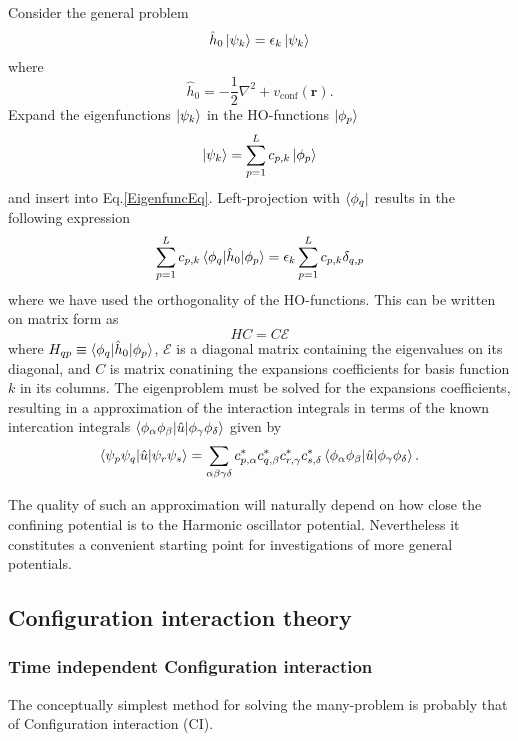 \documentclass[aip,jcp,reprint,floatfix]{revtex4-1}
\begin{document}
Consider the general problem
\begin{equation}
 \hat{h}_0 \ket{\psi_k} = \epsilon_k \ket{\psi_k} \label{EigenfuncEq}
\end{equation}
where 
\begin{equation}
 \hat{h}_0 = -\frac{1}{2}\nabla^2 + v_{\text{conf}}(\mathbf{r}).
\end{equation}
Expand the eigenfunctions $\ket{\psi_k}$ in the HO-functions $\ket{\phi_p}$
\begin{equation}
 \ket{\psi_k} = \sum_{p=1}^L c_{p,k} \ket{\phi_p} 
\end{equation}
and insert into Eq.\eqref{EigenfuncEq}. Left-projection with
$\bra{\phi_q}$ results in the following expression
\begin{equation}
 \sum_{p=1}^L c_{p,k} \braket{\phi_q|\hat{h}_0|\phi_p} = \epsilon_k \sum_{p=1}^L c_{p,k} \delta_{q,p}
\end{equation}
where we have used the orthogonality of the HO-functions. This can be written on matrix form as 
\begin{equation}
 HC = C\mathcal{E}
\end{equation}
where $H_{qp} \equiv \braket{\phi_q|\hat{h}_0|\phi_p}$, $\mathcal{E}$
is a diagonal matrix containing the eigenvalues on its diagonal, and
$C$ is matrix conatining the expansions coefficients for basis
function $k$ in its columns. The eigenproblem must be solved for the
expansions coefficients, resulting in a approximation of the
interaction integrals in terms of the known intercation integrals
$\braket{\phi_\alpha \phi_\beta|\hat{u}|\phi_\gamma \phi_\delta}$
given by
\begin{equation}
 \braket{\psi_p \psi_q| \hat{u}| \psi_r \psi_s} = \sum_{\alpha \beta \gamma \delta} c^*_{p,\alpha} c^*_{q,\beta} c^*_{r,\gamma} c^*_{s,\delta} \braket{\phi_\alpha \phi_\beta|\hat{u}|\phi_\gamma \phi_\delta}.
\end{equation}

The quality of such an approximation will naturally depend on how
close the confining potential is to the Harmonic oscillator
potential. Nevertheless it constitutes a convenient starting point for
investigations of more general potentials.

\subsection{Configuration interaction theory}

\subsubsection{Time independent Configuration interaction}
The conceptually simplest method for solving the many-problem is
probably that of Configuration interaction (CI).
\end{document}
